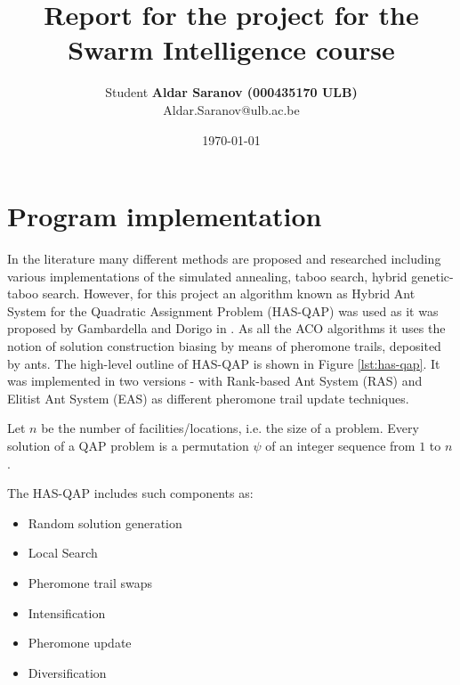 \documentclass[12pt]{article}
\author{Student \textbf{Aldar Saranov (000435170 ULB)} \\ Aldar.Saranov@ulb.ac.be}
\date{\today}
\title{Report for the project for the Swarm Intelligence course}
\begin{document}
\maketitle
\newpage
\tableofcontents
\newpage



\section{Program implementation}

In the literature many different methods are proposed and researched including various implementations of the simulated annealing, taboo search, hybrid genetic-taboo search. However, for this project an algorithm known as Hybrid Ant System for the Quadratic Assignment Problem (HAS-QAP) was used as it was proposed by Gambardella and Dorigo in \cite{Gambardella}. As all the ACO algorithms it uses the notion of solution construction biasing by means of pheromone trails, deposited by ants. The high-level outline of HAS-QAP is shown in Figure \ref{lst:has-qap}. It was implemented in two versions - with Rank-based Ant System (RAS) and Elitist Ant System (EAS) as different pheromone trail update techniques.

Let $n$ be the number of facilities/locations, i.e. the size of a problem. Every solution of a QAP problem is a permutation $\psi$ of an integer sequence from $1$ to $n$.

The HAS-QAP includes such components as:

\begin{itemize}
\item Random solution generation
\item Local Search
\item Pheromone trail swaps
\item Intensification
\item Pheromone update
\item Diversification
\end{itemize}
\end{document}
